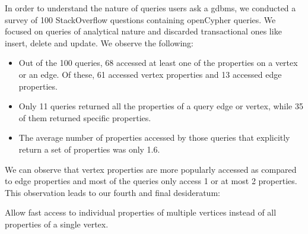 \begin{guideline}
	In order to understand the nature of queries users ask a \gls{gdbms}, we conducted a survey of 100 StackOverflow questions containing openCypher queries. We focused on queries of analytical nature and discarded transactional ones like insert, delete and update. We observe the following: 
	
	
	\begin{itemize}
		
		\item Out of the 100 queries, 68 accessed at least one of the properties on a vertex or an edge. Of these, 61 accessed vertex properties and 13 accessed edge properties.
		
		\item Only 11 queries returned all the properties of a query edge or vertex, while 35 of them returned specific properties.
		
		\item The average number of properties accessed by those queries that explicitly return a set of properties was only 1.6.
		
	\end{itemize}
	
	We can observe that vertex properties are more popularly accessed as compared to edge properties and most of the queries only access 1 or at most 2 properties. This observation leads to our fourth and final desideratum:
	
	\begin{desideratum}
		Allow fast access to individual properties of multiple vertices instead of all properties of a single vertex.
	\end{desideratum}
	
\end{guideline}
